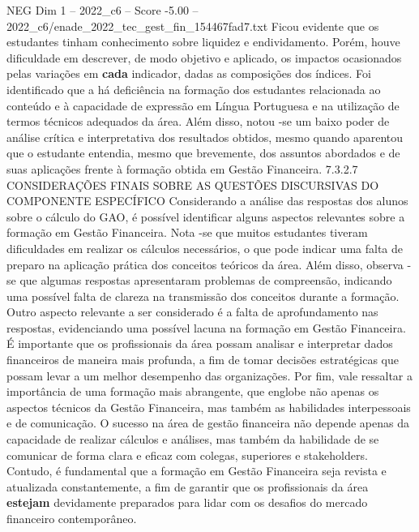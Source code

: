 \begin{textsample}{NEG Dim 1 – 2022\_c6 – Score -5.00 – 2022\_c6/enade\_2022\_tec\_gest\_fin\_154467fad7.txt}
Ficou evidente que os estudantes tinham conhecimento sobre liquidez e endividamento.
Porém, houve dificuldade em descrever, de modo objetivo e aplicado, os impactos ocasionados pelas variações em \textbf{cada} indicador, dadas as composições dos índices.
Foi identificado que a há deficiência na formação dos estudantes relacionada ao conteúdo e à capacidade de expressão em Língua Portuguesa e na utilização de termos técnicos adequados da área.
Além disso, notou -se um baixo poder de análise crítica e interpretativa dos resultados obtidos, mesmo quando aparentou que o estudante entendia, mesmo que brevemente, dos assuntos abordados e de suas aplicações frente à formação obtida em Gestão Financeira. 7.3.2.7 CONSIDERAÇÕES FINAIS SOBRE AS QUESTÕES DISCURSIVAS DO COMPONENTE ESPECÍFICO Considerando a análise das respostas dos alunos sobre o cálculo do GAO, é possível identificar alguns aspectos relevantes sobre a formação em Gestão Financeira.
Nota -se que muitos estudantes tiveram dificuldades em realizar os cálculos necessários, o que pode indicar uma falta de preparo na aplicação prática dos conceitos teóricos da área.
Além disso, observa -se que algumas respostas apresentaram problemas de compreensão, indicando uma possível falta de clareza na transmissão dos conceitos durante a formação.
Outro aspecto relevante a ser considerado é a falta de aprofundamento nas respostas, evidenciando uma possível lacuna na formação em Gestão Financeira.
É importante que os profissionais da área possam analisar e interpretar dados financeiros de maneira mais profunda, a fim de tomar decisões estratégicas que possam levar a um melhor desempenho das organizações.
Por fim, vale ressaltar a importância de uma formação mais abrangente, que englobe não apenas os aspectos técnicos da Gestão Financeira, mas também as habilidades interpessoais e de comunicação.
O sucesso na área de gestão financeira não depende apenas da capacidade de realizar cálculos e análises, mas também da habilidade de se comunicar de forma clara e eficaz com colegas, superiores e stakeholders.
Contudo, é fundamental que a formação em Gestão Financeira seja revista e atualizada constantemente, a fim de garantir que os profissionais da área \textbf{estejam} devidamente preparados para lidar com os desafios do mercado financeiro contemporâneo.

\end{textsample}
